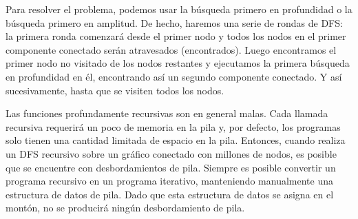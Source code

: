 Para resolver el problema, podemos usar la búsqueda primero en profundidad o la búsqueda primero en  amplitud. De hecho, haremos una serie de rondas de DFS: la primera ronda comenzará desde el primer nodo  y todos los nodos en el primer componente conectado serán atravesados (encontrados). Luego encontramos  el primer nodo no visitado de los nodos restantes y ejecutamos la primera búsqueda en  profundidad en él, encontrando así un segundo componente conectado. Y así sucesivamente, hasta que se  visiten todos los nodos.

Las funciones profundamente recursivas son en general malas. Cada llamada recursiva requerirá un poco de memoria en la pila y, por defecto, los programas solo tienen una cantidad limitada de espacio en la pila. Entonces, cuando realiza un DFS recursivo sobre un gráfico conectado con millones de nodos, es posible que se encuentre con desbordamientos de pila. Siempre es posible convertir un programa recursivo en un programa iterativo, manteniendo manualmente una estructura de datos de pila. Dado que esta estructura de datos se asigna en el montón, no se producirá ningún desbordamiento de pila.
